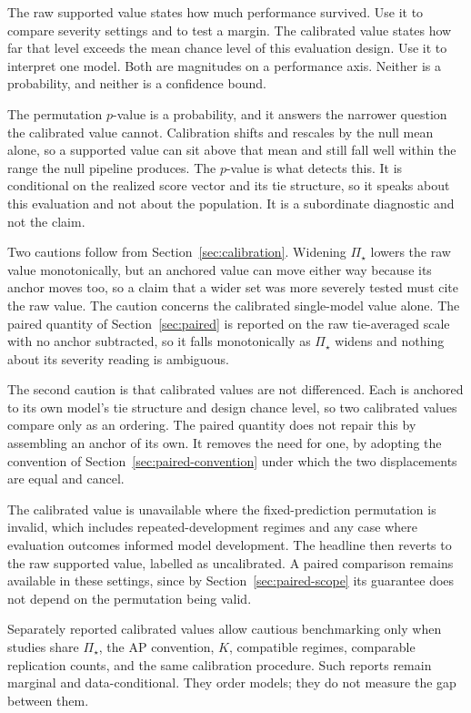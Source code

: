 \documentclass[11pt]{article}
\newcommand{\PSet}{\Pi_\star}
\theoremstyle{remark}
\begin{document}
The raw supported value states how much performance survived. Use it to compare severity settings and to test a margin. The calibrated value states how far that level exceeds the mean chance level of this evaluation design. Use it to interpret one model. Both are magnitudes on a performance axis. Neither is a probability, and neither is a confidence bound.

The permutation $p$-value is a probability, and it answers the narrower question the calibrated value cannot. Calibration shifts and rescales by the null mean alone, so a supported value can sit above that mean and still fall well within the range the null pipeline produces. The $p$-value is what detects this. It is conditional on the realized score vector and its tie structure, so it speaks about this evaluation and not about the population. It is a subordinate diagnostic and not the claim.

Two cautions follow from Section~\ref{sec:calibration}. Widening $\PSet$ lowers the raw value monotonically, but an anchored value can move either way because its anchor moves too, so a claim that a wider set was more severely tested must cite the raw value. The caution concerns the calibrated single-model value alone. The paired quantity of Section~\ref{sec:paired} is reported on the raw tie-averaged scale with no anchor subtracted, so it falls monotonically as $\PSet$ widens and nothing about its severity reading is ambiguous.

The second caution is that calibrated values are not differenced. Each is anchored to its own model's tie structure and design chance level, so two calibrated values compare only as an ordering. The paired quantity does not repair this by assembling an anchor of its own. It removes the need for one, by adopting the convention of Section~\ref{sec:paired-convention} under which the two displacements are equal and cancel.

The calibrated value is unavailable where the fixed-prediction permutation is invalid, which includes repeated-development regimes and any case where evaluation outcomes informed model development. The headline then reverts to the raw supported value, labelled as uncalibrated. A paired comparison remains available in these settings, since by Section~\ref{sec:paired-scope} its guarantee does not depend on the permutation being valid.

Separately reported calibrated values allow cautious benchmarking only when studies share $\PSet$, the AP convention, $K$, compatible regimes, comparable replication counts, and the same calibration procedure. Such reports remain marginal and data-conditional. They order models; they do not measure the gap between them.
\end{document}
